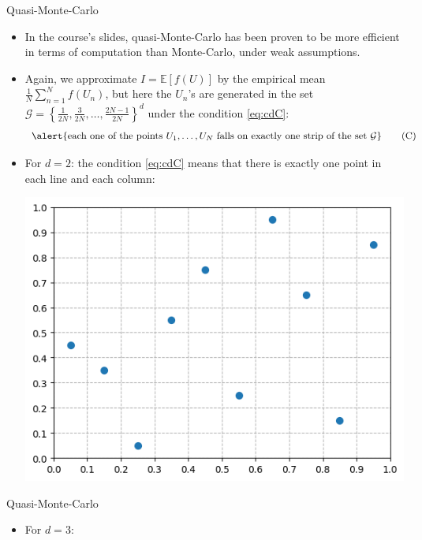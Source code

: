 \documentclass[aspectratio=169,xcolor=dvipsnames]{beamer}
\begin{document}
    \begin{frame}{Quasi-Monte-Carlo}
        \begin{itemize}
            \item<1-> In the course's slides, quasi-Monte-Carlo has been proven to be more efficient in terms of computation than Monte-Carlo, under weak assumptions.

            \item<2-> Again, we approximate $I = \mathbb{E}[f(U)]$ by the empirical mean $\frac{1}{N} \sum_{n = 1}^N f(U_n)$, but here the $U_n$'s are generated in the set $\mathcal G = \left\{\frac{1}{2N}, \frac{3}{2N}, \dots, \frac{2N - 1}{2N}\right\}^d$ under the condition \eqref{eq:cdC}:
            \begin{equation}
                \alert{\text{each one of the points } U_1, \dots, U_N \text{ falls on exactly one strip of the set } \mathcal G} \tag{C}\label{eq:cdC}
            \end{equation}

            \item<3-> For $d = 2$: the condition \eqref{eq:cdC} means that there is exactly one point in each line and each column:
            \begin{center}
                \includegraphics[width=\textwidth/3]{points2.png}
            \end{center}
        \end{itemize}
    \end{frame}

    \begin{frame}{Quasi-Monte-Carlo}
        \begin{itemize}
            \item For $d = 3$:
            \begin{center}
            \end{center}
        \end{itemize}
    \end{frame}
\end{document}
